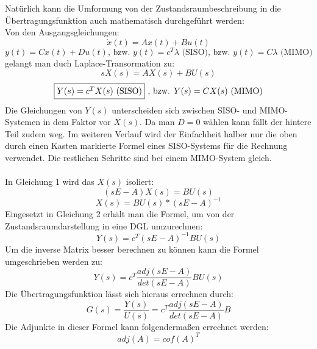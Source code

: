 Natürlich kann die Umformung von der Zustandsraumbeschreibung in die Übertragungsfunktion auch mathematisch durchgeführt werden:\\
Von den Ausgangsgleichungen:
\begin{equation*}
	\dot{x}(t) = Ax(t) + Bu(t)
\end{equation*}
\begin{equation*}
	y(t) = Cx(t) + Du(t) \text{, bzw. } y(t) = c^{T}\lambda \text{ (SISO), bzw. } y(t) = C\lambda \text{ (MIMO)}
\end{equation*}
gelangt man duch Laplace-Transormation zu:
\begin{equation*}
	sX(s) = AX(s) + BU(s)
\end{equation*}
\begin{equation*}
	\fbox{$Y(s) = c^{T}X(s) \text{ (SISO)}$} \text{ , bzw. } Y(s) = CX(s) \text{ (MIMO)}
\end{equation*}
Die Gleichungen von $Y(s)$ unterscheiden sich zwischen SISO- und MIMO-Systemen in dem Faktor vor $X(s)$. Da man $D=0$ wählen kann fällt der hintere Teil zudem weg. Im weiteren Verlauf wird der Einfachheit halber nur die oben durch einen Kasten markierte Formel eines SISO-Systems für die Rechnung verwendet. Die restlichen Schritte sind bei einem MIMO-System gleich.\\\\
In Gleichung 1 wird das $X(s)$ isoliert:
\begin{equation*}
	(sE-A)X(s) = BU(s)
\end{equation*}
\begin{equation*}
	X(s) = BU(s) * (sE-A)^{-1}
\end{equation*}
Eingesetzt in Gleichung 2 erhält man die Formel, um von der Zustandsraumdarstellung in eine DGL umzurechnen:
\begin{equation*}
	Y(s) = c^{T}(sE-A)^{-1}BU(s)
\end{equation*}
Um die inverse Matrix besser berechnen zu können kann die Formel umgeschrieben werden zu:
\begin{equation*}
	Y(s) = c^{T}\frac{adj(sE-A)}{det(sE-A)}BU(s)
\end{equation*}
Die Übertragungsfunktion lässt sich hieraus errechnen durch:
\begin{equation*}
	G(s) = \frac{Y(s)}{U(s)} = c^{T}\frac{adj(sE-A)}{det(sE-A)}B
\end{equation*}
Die Adjunkte in dieser Formel kann folgendermaßen errechnet werden:
\begin{equation*}
	adj(A) = cof(A)^{T}
\end{equation*}
